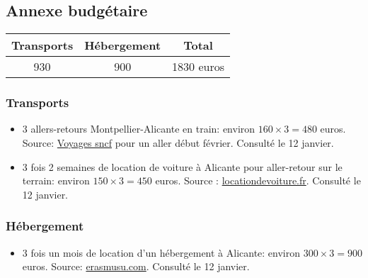 \documentclass[12pt]{article} %
\begin{document}
\printbibliography

\subsection{Annexe budgétaire}

\begin{tabular}{|c|c|c|}
\hline 
Transports & Hébergement & Total \\ 
\hline 
930 & 900 & 1830 euros \\ 
\hline 
\end{tabular} 


\subsubsection{Transports}

\begin{itemize}
\item 3 allers-retours Montpellier-Alicante en train: environ $160 \times 3 = 480$ euros. Source: \href{http://www.voyages-sncf.com}{Voyages sncf} pour un aller début février. Consulté le 12 janvier. 

\item 3 fois 2 semaines de location de voiture à Alicante pour aller-retour sur le terrain: environ $150 \times 3 = 450$ euros. Source : \href{https://www.locationdevoiture.fr/}{locationdevoiture.fr}. Consulté le 12 janvier.
\end{itemize}

\subsubsection{Hébergement}

\begin{itemize}
\item 3 fois un mois de location d'un hébergement à Alicante: environ $300 \times 3 = 900$ euros. Source:
\href{http://erasmusu.com/fr/erasmus-alicante/logement-etudiant}{erasmusu.com}. Consulté le 12 janvier.
\end{itemize}
\end{document}
